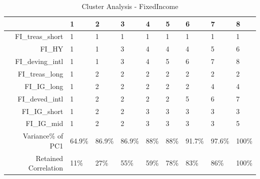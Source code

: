 \begin{longtable}{rllllllll}
\caption{Cluster Analysis - FixedIncome} \\ 
  \hline
 & 1 & 2 & 3 & 4 & 5 & 6 & 7 & 8 \\ 
  \hline
FI\_treas\_short & 1 & 1 & 1 & 1 & 1 & 1 & 1 & 1 \\ 
  FI\_HY & 1 & 1 & 3 & 4 & 4 & 4 & 5 & 6 \\ 
  FI\_deving\_intl & 1 & 1 & 3 & 4 & 5 & 6 & 7 & 8 \\ 
  FI\_treas\_long & 1 & 2 & 2 & 2 & 2 & 2 & 2 & 2 \\ 
  FI\_IG\_long & 1 & 2 & 2 & 2 & 2 & 2 & 4 & 4 \\ 
  FI\_deved\_intl & 1 & 2 & 2 & 2 & 2 & 5 & 6 & 7 \\ 
  FI\_IG\_short & 1 & 2 & 2 & 3 & 3 & 3 & 3 & 3 \\ 
  FI\_IG\_mid & 1 & 2 & 2 & 3 & 3 & 3 & 3 & 5 \\ 
  Variance\% of PC1 & 64.9\% & 86.9\% & 86.9\% & 88\% & 88\% & 91.7\% & 97.6\% & 100\% \\ 
  Retained Correlation & 11\% & 27\% & 55\% & 59\% & 78\% & 83\% & 86\% & 100\% \\ 
   \hline
\hline
\end{longtable}
